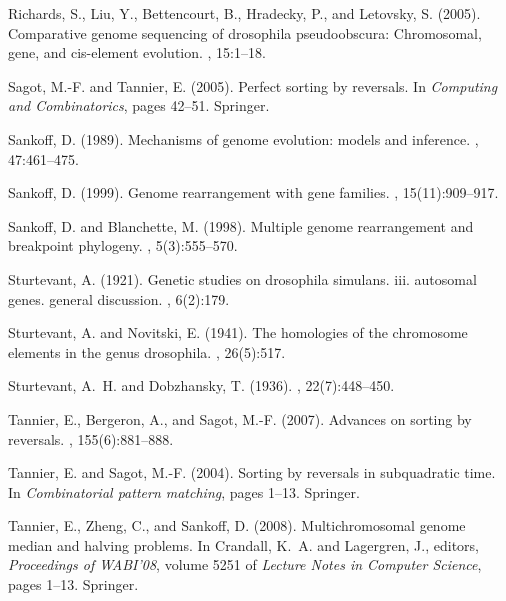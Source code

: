\documentclass[11pt,final,twoside,nofrench]{thlifl}
\begin{document}
{\begin{thebibliography}{}
Richards, S., Liu, Y., Bettencourt, B., Hradecky, P., and Letovsky, S. (2005).
\newblock Comparative genome sequencing of drosophila pseudoobscura:
  Chromosomal, gene, and cis-element evolution.
, 15:1--18.

Sagot, M.-F. and Tannier, E. (2005).
\newblock Perfect sorting by reversals.
\newblock In {\em Computing and Combinatorics}, pages 42--51. Springer.

Sankoff, D. (1989).
\newblock Mechanisms of genome evolution: models and inference.
, 47:461--475.

Sankoff, D. (1999).
\newblock Genome rearrangement with gene families.
, 15(11):909--917.

Sankoff, D. and Blanchette, M. (1998).
\newblock Multiple genome rearrangement and breakpoint phylogeny.
, 5(3):555--570.

Sturtevant, A. (1921).
\newblock Genetic studies on drosophila simulans. iii. autosomal genes. general
  discussion.
, 6(2):179.

Sturtevant, A. and Novitski, E. (1941).
\newblock The homologies of the chromosome elements in the genus drosophila.
, 26(5):517.

Sturtevant, A.~H. and Dobzhansky, T. (1936).
, 22(7):448--450.

Tannier, E., Bergeron, A., and Sagot, M.-F. (2007).
\newblock Advances on sorting by reversals.
, 155(6):881--888.

Tannier, E. and Sagot, M.-F. (2004).
\newblock Sorting by reversals in subquadratic time.
\newblock In {\em Combinatorial pattern matching}, pages 1--13. Springer.

Tannier, E., Zheng, C., and Sankoff, D. (2008).
\newblock Multichromosomal genome median and halving problems.
\newblock In Crandall, K.~A. and Lagergren, J., editors, {\em Proceedings of
  WABI'08}, volume 5251 of {\em Lecture Notes in Computer Science}, pages
  1--13. Springer.


\end{thebibliography}}
\end{document}
